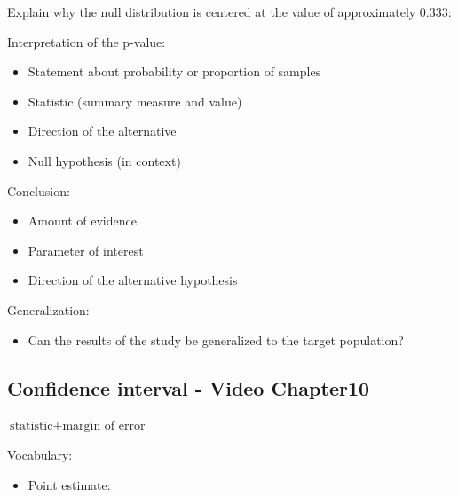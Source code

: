 \documentclass[
]{report}
\providecommand{\tightlist}{%
  \setlength{\itemsep}{0pt}\setlength{\parskip}{0pt}}
\newcommand{\rgi}{\hspace{24pt}}  %
\begin{document}
Explain why the null distribution is centered at the value of approximately 0.333:

\vspace{0.5in}

Interpretation of the p-value:

\begin{itemize}
\item
  Statement about probability or proportion of samples
\item
  Statistic (summary measure and value)
\item
  Direction of the alternative
\item
  Null hypothesis (in context)
\end{itemize}

\vspace{0.8in}

\newpage

Conclusion:

\begin{itemize}
\item
  Amount of evidence
\item
  Parameter of interest
\item
  Direction of the alternative hypothesis
\end{itemize}

\vspace{0.6in}

Generalization:

\begin{itemize}
\tightlist
\item
  Can the results of the study be generalized to the target population?
\end{itemize}

\vspace{0.4in}

\subsection*{Confidence interval - Video Chapter10}\label{confidence-interval---video-chapter10}

\rgi \(\text{statistic} \pm \text{margin of error}\)

Vocabulary:

\begin{itemize}
\tightlist
\item
  Point estimate:
\end{itemize}
\end{document}
